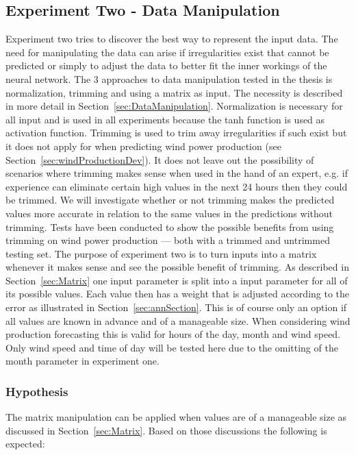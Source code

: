 \subsection{Experiment Two - Data Manipulation}
\label{sec:windProdExperimentTwo}
Experiment two tries to discover the best way to represent the input data. The need for manipulating the data can arise if irregularities exist that cannot be predicted or simply to adjust the data to better fit the inner workings of the neural network. The 3 approaches to data manipulation tested in the thesis is normalization, trimming and using a matrix as input. The necessity is described in more detail in Section~\ref{sec:DataManipulation}. Normalization is necessary for all input and is used in all experiments because the tanh function is used as activation function. Trimming is used to trim away irregularities if such exist but it does not apply for when predicting wind power production (see Section~\ref{sec:windProductionDev}). It does not leave out the possibility of scenarios where trimming makes sense when used in the hand of an expert, e.g. if experience can eliminate certain high values in the next 24 hours then they could be trimmed. We will investigate whether or not trimming makes the predicted values more accurate in relation to the same values in the predictions without trimming. Tests have been conducted to show the possible benefits from using trimming on wind power production --- both with a trimmed and untrimmed testing set. The purpose of experiment two is to turn inputs into a matrix whenever it makes sense and see the possible benefit of trimming. As described in Section~\ref{sec:Matrix} one input parameter is split into a input parameter for all of its possible values. Each value then has a weight that is adjusted according to the error as illustrated in Section~\ref{sec:annSection}. This is of course only an option if all values are known in advance and of a manageable size. When considering wind production forecasting this is valid for hours of the day, month and wind speed. Only wind speed and time of day will be tested here due to the omitting of the month parameter in experiment one. 

\subsubsection{Hypothesis} 
The matrix manipulation can be applied when values are of a manageable size as discussed in Section~\ref{sec:Matrix}. Based on those discussions the following is expected: 


